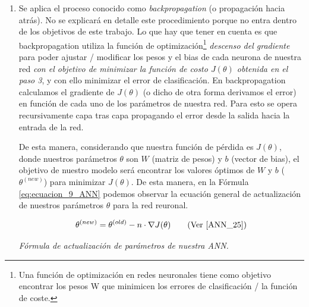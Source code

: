 \documentclass[12pt,a4paper]{article}
\begin{document}
\begin{sloppypar}
\begin{enumerate}
La función de pérdida $J(\theta)$ será diferente para cada modelo. Más adelante obtendremos los cálculos de las $J(\theta)$ que tendremos en consideración para nuestra implementación: Fórmulas \ref{eq:ecuacion_11_NLP} y \ref{eq:ecuacion_21_NLP}, siendo esta última la que finalmente utilizaremos en nuestro modelo y buscaremos minimizar. Ambas funciones de costo son la sumatoria sobre los costos individuales en los que incurre la red al clasificar cada elemento del conjunto de entrenamiento, y se calculan 1 vez por epoch\footnote{Epoch es un hiper-parámetro de nuestra red neuronal, donde cada epoch representa una iteración sobre nuestros datos de entrenamiento completo. Esta iteración incluye el cálculo de los forward propagation y back propagation correspondientes.}.

\item Se aplica el proceso conocido como \textit{backpropagation} (o propagación hacia atrás). No se explicará en detalle este procedimiento porque no entra dentro de los objetivos de este trabajo. Lo que hay que tener en cuenta es que backpropagation utiliza la función de optimización\footnote{Una función de optimización en redes neuronales tiene como objetivo encontrar los pesos W que minimicen los errores de clasificación / la función de coste.} \textit{descenso del gradiente} para poder ajustar / modificar los pesos y el bias de cada neurona de nuestra red \textit{con el objetivo de minimizar la función de costo $J(\theta)$ obtenida en el paso 3}, y con ello minimizar el error de clasificación. En backpropagation calculamos el gradiente de $J(\theta)$ (o dicho de otra forma derivamos el error) en función de cada uno de los parámetros de nuestra red. Para esto se opera recursivamente capa tras capa propagando el error desde la salida hacia la entrada de la red.

De esta manera, considerando que nuestra función de pérdida es $J(\theta)$, donde nuestros parámetros $\theta$ son $W$ (matriz de pesos) y $b$ (vector de bias), el objetivo de nuestro modelo será encontrar los valores óptimos de $W$ y $b$ ($\theta^{(new)}$) para minimizar $J(\theta)$. De esta manera, en la Fórmula \ref{eq:ecuacion_9_ANN} podemos observar la ecuación general de actualización de nuestros parámetros $\theta$ para la red reuronal.
 
\begin{equation}\label{eq:ecuacion_9_ANN}
\theta^{(new)} = \theta^{(old)} - n \cdot \nabla J(\theta)   \qquad \text{(Ver \cite{ANN_25})}
\end{equation}
\begin{center}
\textit{Fórmula de actualización de parámetros de nuestra ANN.}
\end{center}


\end{enumerate}
\end{sloppypar}
\end{document}
